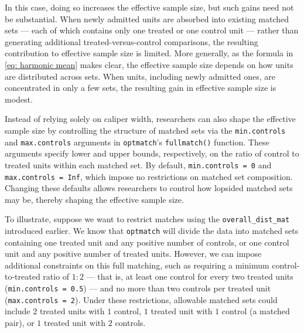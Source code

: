 \documentclass[
  12pt,
  leqno]{article}
\begin{document}
\doublespacing

In this case, doing so increases the effective sample size, but such
gains need not be substantial. When newly admitted units are absorbed
into existing matched sets --- each of which contains only one treated
or one control unit --- rather than generating additional
treated-versus-control comparisons, the resulting contribution to
effective sample size is limited. More generally, as the formula in
\eqref{eq: harmonic mean} makes clear, the effective sample size depends
on how units are distributed across sets. When units, including newly
admitted ones, are concentrated in only a few sets, the resulting gain
in effective sample size is modest.

Instead of relying solely on caliper width, researchers can also shape
the effective sample size by controlling the structure of matched sets
via the \texttt{min.controls} and \texttt{max.controls} arguments in
\texttt{optmatch}'s \texttt{fullmatch()} function. These arguments
specify lower and upper bounds, respectively, on the ratio of control to
treated units within each matched set. By default,
\texttt{min.controls\ =\ 0} and \texttt{max.controls\ =\ Inf}, which
impose no restrictions on matched set composition. Changing these
defaults allows researchers to control how lopsided matched sets may be,
thereby shaping the effective sample size.

To illustrate, suppose we want to restrict matches using the
\texttt{overall\_dist\_mat} introduced earlier. We know that
\texttt{optmatch} will divide the data into matched sets containing one
treated unit and any positive number of controls, or one control unit
and any positive number of treated units. However, we can impose
additional constraints on this full matching, such as requiring a
minimum control-to-treated ratio of \(1{:}2\) --- that is, at least one
control for every two treated units (\texttt{min.controls\ =\ 0.5}) ---
and no more than two controls per treated unit
(\texttt{max.controls\ =\ 2}). Under these restrictions, allowable
matched sets could include \(2\) treated units with \(1\) control, \(1\)
treated unit with \(1\) control (a matched pair), or \(1\) treated unit
with \(2\) controls.

\singlespacing
\end{document}
